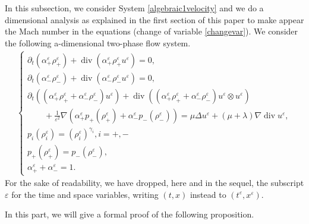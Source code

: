 \documentclass[11pt, twoside, a4paper]{article}
\theoremstyle{plain}
\theoremstyle{remark}
\numberwithin{equation}{section}
\renewcommand{\div}{\operatorname{div}}
\renewcommand{\epsilon}{\varepsilon}
\newcommand{\eps}{\varepsilon}
\begin{document}
In this subsection, we consider System \eqref{algebraic1velocity} and we do a dimensional analysis as explained in the first section of this paper to make appear the Mach number in the equations (change of variable \eqref{changevar}).
We consider the following a-dimensional two-phase flow system.
\begin{align}
    \left\{
        \begin{array}{l}\label{system_eps}
            \partial_t (\alpha_+^{\epsilon} \rho_+^{\epsilon}) + \div(\alpha_+^{\epsilon}\rho_+^{\epsilon}u^{\epsilon}) = 0,\\
            \partial_t (\alpha_-^{\epsilon} \rho_-^{\epsilon}) + \div(\alpha_-^{\epsilon}\rho_-^{\epsilon}u^{\epsilon}) = 0,\\
            \partial_t ((\alpha_+^{\epsilon} \rho_+^{\epsilon} + \alpha_-^{\epsilon}\rho_-^{\epsilon})u^{\epsilon}) + \div((\alpha_+^{\epsilon}\rho_+^{\epsilon} + \alpha_-^{\epsilon}\rho_-^{\epsilon})u^{\epsilon}\otimes u^{\epsilon})\\
            \quad \quad + \frac{1}{\epsilon^2} \nabla (\alpha_+^{\epsilon}p_+(\rho_+^{\epsilon})+\alpha_-^{\epsilon}p_-(\rho_-^{\epsilon})) = \mu \Delta u^{\epsilon} + (\mu + \lambda)\nabla \div u^{\epsilon},\\
            p_i(\rho_i^{\epsilon}) = (\rho_i^{\epsilon})^{\gamma_i}, i=+,-\\
            p_+(\rho_+^{\epsilon}) = p_-(\rho_-^{\epsilon}),\\
            \alpha_+^{\epsilon} + \alpha_-^{\epsilon} = 1.
        \end{array}
    \right .
\end{align}
For the sake of readability, we have dropped, here and in the sequel, the subscript $\eps$ for the time and space variables, writing $(t,x)$ instead to $(t^\eps,x^\eps)$.

In this part, we will give a formal proof of the following proposition.
\end{document}
